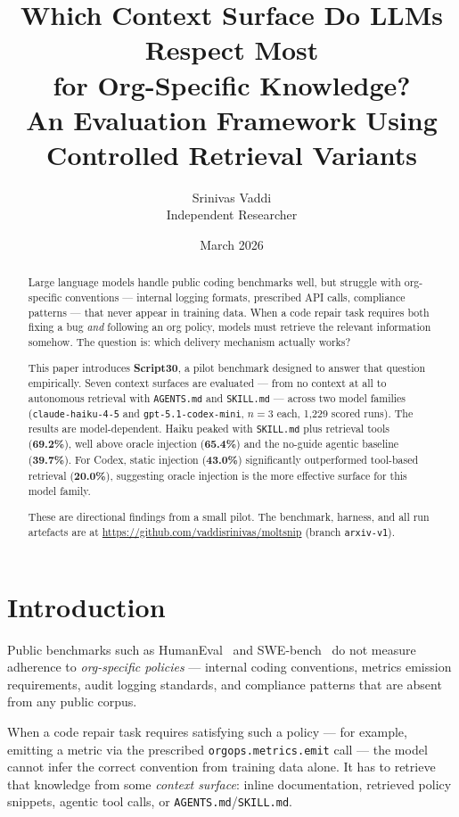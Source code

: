 \documentclass[10pt,a4paper,twocolumn]{article}
\title{Which Context Surface Do LLMs Respect Most\\for Org-Specific Knowledge?\\[0.5em]
\large An Evaluation Framework Using Controlled Retrieval Variants}
\author{Srinivas Vaddi\\Independent Researcher}
\date{March 2026}
\begin{document}
\maketitle
\begin{abstract}
Large language models handle public coding benchmarks well, but struggle with org-specific conventions --- internal logging formats, prescribed API calls, compliance patterns --- that never appear in training data. When a code repair task requires both fixing a bug \emph{and} following an org policy, models must retrieve the relevant information somehow.
The question is: which delivery mechanism actually works?

This paper introduces \textbf{Script30}, a pilot benchmark designed to
answer that question empirically. Seven context surfaces are evaluated --- from no context at all to autonomous retrieval with \texttt{AGENTS.md} and \texttt{SKILL.md} --- across two
model families (\texttt{claude-haiku-4-5} and \texttt{gpt-5.1-codex-mini}, $n{=}3$ each, 1,229 scored runs).
The results are model-dependent. Haiku peaked with \texttt{SKILL.md} plus retrieval tools (\textbf{69.2\%}), well above oracle injection (\textbf{65.4\%}) and the no-guide agentic
baseline (\textbf{39.7\%}). For Codex, static injection (\textbf{43.0\%}) significantly outperformed tool-based retrieval (\textbf{20.0\%}), suggesting oracle injection is the more effective surface for this model family.

These are directional findings from a small pilot. The benchmark, harness, and all run artefacts are at \url{https://github.com/vaddisrinivas/moltsnip} (branch \texttt{arxiv-v1}).
\end{abstract}

\section{Introduction}
\label{sec:introduction}

Public benchmarks such as HumanEval~\citep{chen2021evaluating} and
SWE-bench~\citep{jimenez2024swebench} do not measure adherence to
\emph{org-specific policies} --- internal coding conventions, metrics
emission requirements, audit logging standards, and compliance patterns that are absent from any public corpus.

When a code repair task requires satisfying such a policy --- for example, emitting a metric via the prescribed \texttt{orgops.metrics.emit} call --- the model cannot infer the correct convention from training data alone. It has to retrieve that knowledge from some \emph{context surface}: inline
documentation, retrieved policy snippets, agentic tool calls, or \texttt{AGENTS.md}/\texttt{SKILL.md}.
\end{document}
